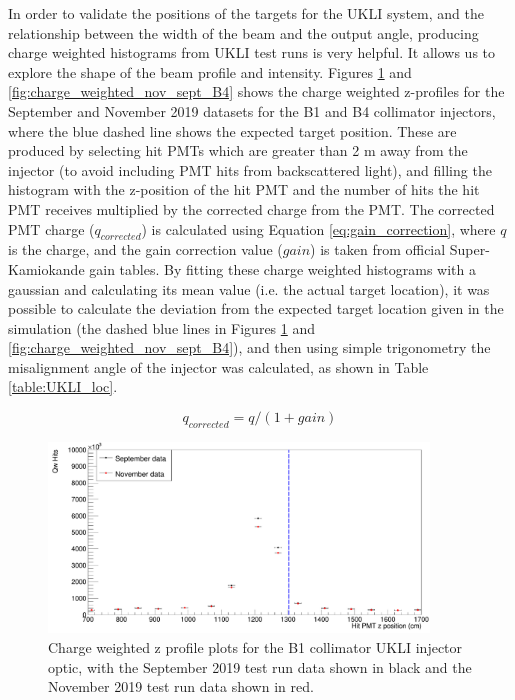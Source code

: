 In order to validate the positions of the targets for the UKLI system, and the relationship between the width of the beam and the output angle, producing charge weighted histograms from UKLI test runs is very helpful. It allows us to explore the shape of the beam profile and intensity. Figures \ref{fig:charge_weighted_nov_sept_B1} and \ref{fig:charge_weighted_nov_sept_B4} shows the charge weighted z-profiles for the September and November 2019 datasets for the B1 and B4 collimator injectors, where the blue dashed line shows the expected target position. These are produced by selecting hit PMTs which are greater than 2 m away from the injector (to avoid including PMT hits from backscattered light), and filling the histogram with the z-position of the hit PMT and the number of hits the hit PMT receives multiplied by the corrected charge from the PMT. The corrected PMT charge ($q_{corrected}$) is calculated using Equation \ref{eq:gain_correction}, where $q$ is the charge, and the gain correction value ($gain$) is taken from official Super-Kamiokande gain tables. By fitting these charge weighted histograms with a gaussian and calculating its mean value (i.e. the actual target location), it was possible to calculate the deviation from the expected target location given in the simulation (the dashed blue lines in Figures \ref{fig:charge_weighted_nov_sept_B1} and \ref{fig:charge_weighted_nov_sept_B4}), and then using simple trigonometry the misalignment angle of the injector was calculated, as shown in Table \ref{table:UKLI_loc}.

\begin{equation}
   q_{corrected} = q/(1 + gain)
\label{eq:gain_correction}
\end{equation}

\begin{figure}
    \centering
    \includegraphics[width=0.9\textwidth]{Figures/charge_weighted_nov_sept_B1.PNG}
    \caption{Charge weighted z profile plots for the B1 collimator UKLI injector optic, with the September 2019 test run data shown in black and the November 2019 test run data shown in red.}
    \label{fig:charge_weighted_nov_sept_B1}
\end{figure}

